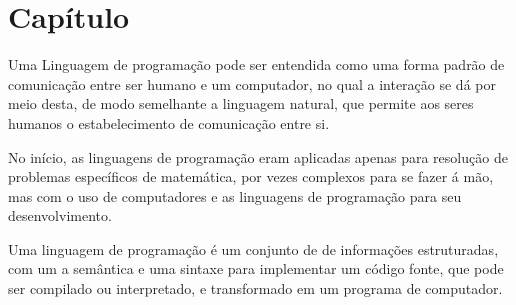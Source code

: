 \documentclass[tcc/ec]{faeng}
\begin{document}
\listatabelas


\sumario

\mainmatter


\chapter[Definição de  Linguagem de Programação]{Capítulo}
Uma Linguagem de programação pode ser entendida como uma forma padrão de comunicação entre ser humano e um computador, no qual a interação se dá por meio desta, de modo semelhante a linguagem  natural, que permite aos seres humanos o estabelecimento de comunicação entre si.

No início, as linguagens de programação eram aplicadas apenas para resolução de problemas específicos de matemática, por vezes complexos para se fazer á mão, mas com o uso de computadores e as linguagens de programação para seu desenvolvimento.

Uma linguagem de programação é um conjunto de de informações estruturadas, com um a semântica e uma sintaxe para implementar um código fonte, que pode ser compilado ou interpretado, e transformado em um programa de computador.
\end{document}
